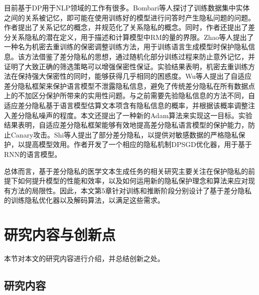 目前基于DP用于NLP领域的工作有很多。Bombari等人\cite{bombari2022towards}探讨了训练数据集中实体之间的关系被记忆，即可能在使用训练好的模型进行问答时产生隐私问题的问题。作者提出了关系记忆的概念，并规范化了关系隐私的概念。同时，作者还提出了差分关系隐私的潜在定义，用于描述和计算模型中RM的量的界限。Zhao等人\cite{zhao2022provably}提出了一种名为机密去重训练的保密调整训练方法，用于训练语言生成模型时保护隐私信息。该方法借鉴了差分隐私的思想，通过随机化部分训练过程来防止意外记忆，并证明了大致正确的筛选策略可以增强保密性保证。实验结果表明，机密去重训练方法在保持强大保密性的同时，能够获得几乎相同的困惑度。Wu等人\cite{DPSSGD}提出了自适应差分隐私框架来保护语言模型不泄露隐私信息，避免了传统差分隐私在所有数据点上的不加区分保护所带来的实用性问题。与之前需要先验隐私信息的方法不同，自适应差分隐私基于语言模型估算文本项含有隐私信息的概率，并根据该概率调整注入差分隐私噪声的程度。本文还提出了一种新的Adam算法来实现这一目标。实验结果表明，自适应差分隐私框架能够有效地提高差分隐私语言模型的保护能力，防止Canary攻击。Shi等人\cite{selectivedp}提出了部分差分隐私，以提供对敏感数据的严格隐私保护，以提高模型效用。作者开发了一个相应的隐私机制DPSGD优化器，用于基于RNN的语言模型。



总体而言，基于差分隐私的医学文本生成任务的相关研究主要关注在保护隐私的前提下如何提升模型的性能和效率，以及如何运用新的隐私保护理念和算法来应对现有方法的局限性。因此，本文第5章针对训练和推断阶段分别设计了基于差分隐私的训练隐私优化器以及解码算法，以满足这些需求。


\section{研究内容与创新点}

本节对本文的研究内容进行介绍，并总结创新之处。

\subsection{研究内容}

